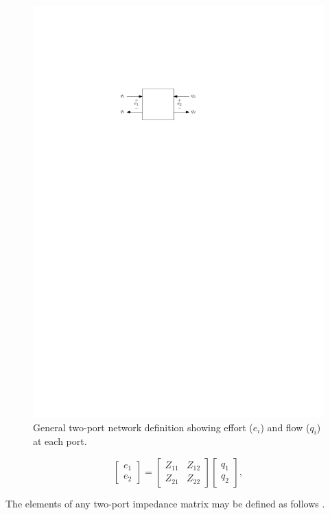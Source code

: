 \documentclass[lettersize,journal]{IEEEtran}
\begin{document}
\begin{figure}[tb]
        \centering
        \includegraphics[width=0.75\columnwidth]{wec_as_multiport_general_two_port_network.pdf}
        \caption{General two-port network definition showing effort ($e_i$) and flow ($q_i$) at each port.}
        \label{fig:wec_as_multiport_general_two_port_network}
\end{figure}

\begin{equation} \label{eq:Z_mat_def_general}
        \begin{bmatrix} e_1 \\ e_2 \end{bmatrix} = \begin{bmatrix} Z_{11} & Z_{12} \\ Z_{21} & Z_{22} \end{bmatrix} \begin{bmatrix} q_1 \\ q_2 \end{bmatrix},
\end{equation}

\noindent{}The elements of any two-port impedance matrix may be defined as follows \cite{Frickey:1994aa}.
\end{document}
